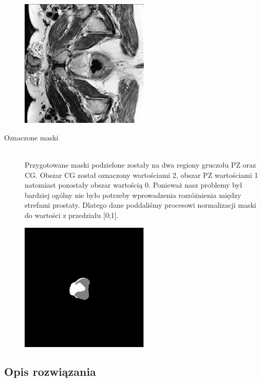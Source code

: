 \documentclass[a4paper,11pt,twoside]{report}
\theoremstyle{definition}
\begin{document}
\begin{description}
	\begin{minipage}{\linewidth}
		\centering
		\includegraphics[width=0.5\textwidth]{segmentation/example_MRI_image.png}
	\end{minipage}


	\item [Oznaczone maski] \hfill \\
Przygotowane maski podzielone zostały na dwa regiony gruczołu PZ oraz CG. Obszar CG został oznaczony wartościami 2, obszar PZ wartościami 1 natomiast pozostały obszar wartością 0.  Ponieważ nasz problemy był bardziej ogólny nie było potrzeby wprowadzenia rozróżnienia między strefami prostaty. Dlatego dane poddaliśmy procesowi normalizacji maski do wartości z przedziału [0;1].

\begin{minipage}{\linewidth}
	\centering
	\includegraphics[width=0.5\textwidth]{segmentation/example_mask.png}
\end{minipage}


\end{description}

\subsection{Opis rozwiązania}
\end{document}
